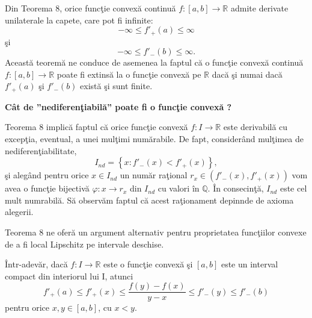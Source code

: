 \documentclass[a4paper,12pt,oneside]{report}
\begin{document}
Din Teorema 8, orice func\c{t}ie convex\u{a} continu\u{a} \(f:\left [ a,b \right ]\rightarrow \mathbb{R}\) admite derivate unilaterale la capete, care pot fi infinite:
\begin{displaymath}
   - \infty  \leq  {f}'_{+}\left ( a \right ) \leq \infty
\end{displaymath}
\c{s}i
\begin{displaymath}
- \infty  \leq  {f}'_{-}\left ( b \right ) \leq \infty.
\end{displaymath}
Aceast\u{a} teorem\u{a} ne conduce de asemenea la faptul c\u{a} o func\c{t}ie convex\u{a} continu\u{a} \(f:\left [ a,b \right ]\rightarrow \mathbb{R}\) poate fi extins\u{a} la o func\c{t}ie convex\u{a} pe \(\mathbb{R}\) dac\u{a} \c{s}i numai dac\u{a}   \({f}'_{+}\left ( a \right )\) \c{s}i  \( {f}'_{-}\left ( b \right )\)  exist\u{a} \c{s}i sunt finite.

\textbf{C\^{a}t de ”nediferen\c{t}iabil\u{a}” poate fi o func\c{t}ie convex\u{a} ?}

Teorema 8 implic\u{a} faptul c\u{a} orice func\c{t}ie convex\u{a} \(f:I \rightarrow \mathbb{R}\) este derivabil\u{a} cu excep\c{t}ia, eventual, a unei mul\c{t}imi num\u{a}rabile. De fapt, consider\^{a}nd mul\c{t}imea de nediferen\c{t}iabilitate,
\begin{displaymath}
   I_{nd} = \left \{ x : {f}'_{-}\left ( x \right )< {f}'_{+}\left ( x \right ) \right \},
\end{displaymath}
\c{s}i aleg\^{a}nd pentru orice \(x \in I_{nd}\) un num\u{a}r ra\c{t}ional \(r_{x} \in \left ( {f}'_{-}\left ( x \right ),  {f}'_{+}\left ( x \right )  \right )\) vom avea o func\c{t}ie bijectiv\u{a} \(\varphi : x \rightarrow r_{x}\) din \(I_{nd}\) cu valori \^{i}n \(\mathbb{Q}\). \^{I}n consecin\c{t}\u{a}, \(I_{nd}\) este cel mult numrabil\u{a}. S\u{a} observ\u{a}m faptul c\u{a} acest ra\c{t}ionament depinnde de axioma alegerii.

Teorema 8 ne ofer\u{a} un argument alternativ pentru proprietatea func\c{t}iilor convexe de a fi local Lipschitz pe intervale deschise.

\^{I}ntr-adev\u{a}r, dac\u{a} \(f : I \rightarrow \mathbb{R}\) este o func\c{t}ie convex\u{a} \c{s}i \(\left [ a,b \right ]\) este un interval compact din interiorul lui I, atunci
\begin{displaymath}
   {f}'_{+}\left ( a \right ) \leq {f}'_{+}\left ( x \right )\leq \frac{f\left ( y \right )- f\left ( x \right )}{y-x}\leq  {f}'_{-}\left ( y \right )\leq {f}'_{-}\left ( b \right )
\end{displaymath}
pentru orice \(x,y \in \left [ a,b \right ]\), cu \(x< y\).
\end{document}
